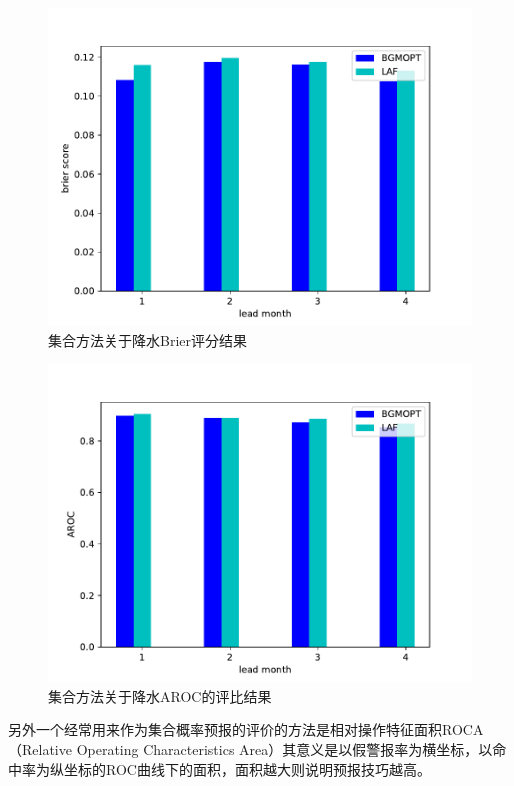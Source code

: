 \begin{figure}[H] %
\label{prectresult}
  \centering
  \includegraphics[scale=0.55]{figures/brier.pdf}
  \caption{集合方法关于降水Brier评分结果}
  \label{fig:xfig1}
\end{figure}


\begin{figure}[H] %
\label{prectresult}
  \centering
  \includegraphics[scale=0.55]{figures/AROC.pdf}
  \caption{集合方法关于降水AROC的评比结果}
  \label{fig:xfig1}
\end{figure}

另外一个经常用来作为集合概率预报的评价的方法是相对操作特征面积ROCA（Relative Operating Characteristics Area）其意义是以假警报率为横坐标，以命中率为纵坐标的ROC曲线下的面积，面积越大则说明预报技巧越高。



